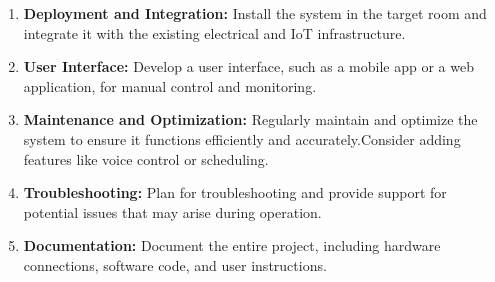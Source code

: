 \documentclass[12pt,a4paper]{report}
\begin{document}
\begin{enumerate}
    \item \textbf{Deployment and Integration:} Install the system in the target room and integrate it with the existing electrical and IoT infrastructure.
    \item \textbf{User Interface:} Develop a user interface, such as a mobile app or a web application, for manual control and monitoring.
    \item \textbf{Maintenance and Optimization:} Regularly maintain and optimize the system to ensure it functions efficiently and accurately.Consider adding features like voice control or scheduling.
    \item \textbf{Troubleshooting:} Plan for troubleshooting and provide support for potential issues that may arise during operation.
    \item \textbf{Documentation:} Document the entire project, including hardware connections, software code, and user instructions.
\end{enumerate}
\end{document}

